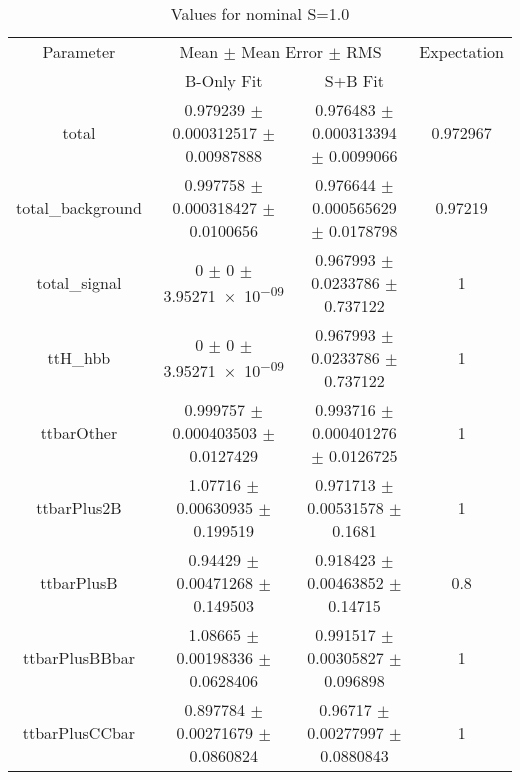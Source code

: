 \begin{table}
\centering
\caption{Values for nominal S=1.0}
\begin{tabular}{cccc}
\toprule
Parameter & \multicolumn{2}{c}{Mean $\pm$ Mean Error $\pm$ RMS} & Expectation\\
 & B-Only Fit & S+B Fit & \\
\midrule
total & \num{0.979239} $\pm$ \num{0.000312517} $\pm$ \num{0.00987888} & \num{0.976483} $\pm$ \num{0.000313394} $\pm$ \num{0.0099066} & \num{0.972967}\\
total\_background & \num{0.997758} $\pm$ \num{0.000318427} $\pm$ \num{0.0100656} & \num{0.976644} $\pm$ \num{0.000565629} $\pm$ \num{0.0178798} & \num{0.97219}\\
total\_signal & \num{0} $\pm$ \num{0} $\pm$ \num{3.95271e-09} & \num{0.967993} $\pm$ \num{0.0233786} $\pm$ \num{0.737122} & \num{1}\\
ttH\_hbb & \num{0} $\pm$ \num{0} $\pm$ \num{3.95271e-09} & \num{0.967993} $\pm$ \num{0.0233786} $\pm$ \num{0.737122} & \num{1}\\
ttbarOther & \num{0.999757} $\pm$ \num{0.000403503} $\pm$ \num{0.0127429} & \num{0.993716} $\pm$ \num{0.000401276} $\pm$ \num{0.0126725} & \num{1}\\
ttbarPlus2B & \num{1.07716} $\pm$ \num{0.00630935} $\pm$ \num{0.199519} & \num{0.971713} $\pm$ \num{0.00531578} $\pm$ \num{0.1681} & \num{1}\\
ttbarPlusB & \num{0.94429} $\pm$ \num{0.00471268} $\pm$ \num{0.149503} & \num{0.918423} $\pm$ \num{0.00463852} $\pm$ \num{0.14715} & \num{0.8}\\
ttbarPlusBBbar & \num{1.08665} $\pm$ \num{0.00198336} $\pm$ \num{0.0628406} & \num{0.991517} $\pm$ \num{0.00305827} $\pm$ \num{0.096898} & \num{1}\\
ttbarPlusCCbar & \num{0.897784} $\pm$ \num{0.00271679} $\pm$ \num{0.0860824} & \num{0.96717} $\pm$ \num{0.00277997} $\pm$ \num{0.0880843} & \num{1}\\
\bottomrule
\end{tabular}
\end{table}